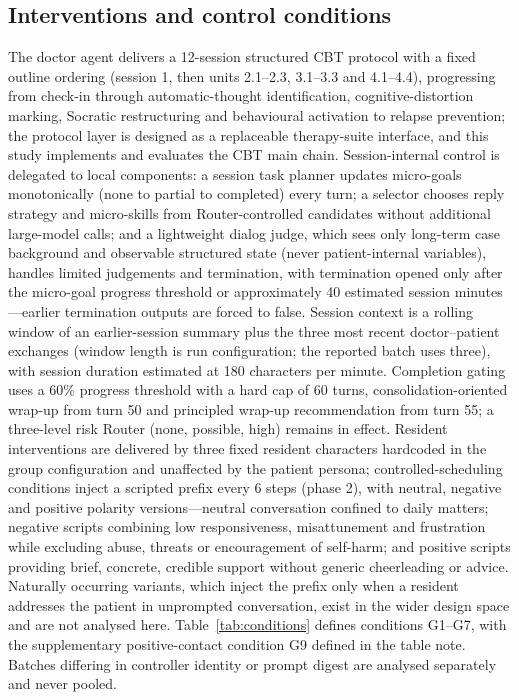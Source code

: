 \documentclass[sn-nature,pdflatex]{sn-jnl}
\begin{document}
\subsection*{Interventions and control conditions}

The doctor agent delivers a 12-session structured CBT protocol with a fixed outline ordering (session 1, then units 2.1--2.3, 3.1--3.3 and 4.1--4.4), progressing from check-in through automatic-thought identification, cognitive-distortion marking, Socratic restructuring and behavioural activation to relapse prevention; the protocol layer is designed as a replaceable therapy-suite interface, and this study implements and evaluates the CBT main chain. Session-internal control is delegated to local components: a session task planner updates micro-goals monotonically (none to partial to completed) every turn; a selector chooses reply strategy and micro-skills from Router-controlled candidates without additional large-model calls; and a lightweight dialog judge, which sees only long-term case background and observable structured state (never patient-internal variables), handles limited judgements and termination, with termination opened only after the micro-goal progress threshold or approximately 40 estimated session minutes---earlier termination outputs are forced to false. Session context is a rolling window of an earlier-session summary plus the three most recent doctor--patient exchanges (window length is run configuration; the reported batch uses three), with session duration estimated at 180 characters per minute. Completion gating uses a 60\% progress threshold with a hard cap of 60 turns, consolidation-oriented wrap-up from turn 50 and principled wrap-up recommendation from turn 55; a three-level risk Router (none, possible, high) remains in effect. Resident interventions are delivered by three fixed resident characters hardcoded in the group configuration and unaffected by the patient persona; controlled-scheduling conditions inject a scripted prefix every 6 steps (phase 2), with neutral, negative and positive polarity versions---neutral conversation confined to daily matters; negative scripts combining low responsiveness, misattunement and frustration while excluding abuse, threats or encouragement of self-harm; and positive scripts providing brief, concrete, credible support without generic cheerleading or advice. Naturally occurring variants, which inject the prefix only when a resident addresses the patient in unprompted conversation, exist in the wider design space and are not analysed here. Table~\ref{tab:conditions} defines conditions G1--G7, with the supplementary positive-contact condition G9 defined in the table note. Batches differing in controller identity or prompt digest are analysed separately and never pooled.
\end{document}
